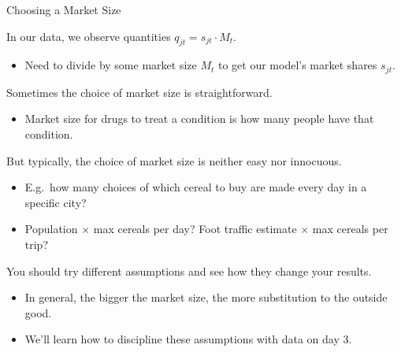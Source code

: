 \documentclass[aspectratio=169,t,11pt,table]{beamer}
\begin{document}
\begin{frame}{Choosing a Market Size}
    \begin{wideitemize}
        \item In our data, we observe quantities $q_{jt} = s_{jt} \cdot M_t$.
        \begin{itemize}
            \item Need to divide by some market size $M_t$ to get our model's market shares $s_{jt}$.
        \end{itemize}
        \pause
        \item Sometimes the choice of market size is straightforward.
        \begin{itemize}
            \item Market size for drugs to treat a condition is how many people have that condition.
        \end{itemize}
        \pause
        \item But typically, the choice of market size is \alert{neither easy nor innocuous}.
        \begin{itemize}
            \item E.g.\ how many choices of which cereal to buy are made every day in a specific city?
            \item Population $\times$ max cereals per day? Foot traffic estimate $\times$ max cereals per trip?
        \end{itemize}
        \pause
        \item You should try different assumptions and see how they change your results.
        \begin{itemize}
            \item In general, the bigger the market size, the more substitution to the outside good.
            \item We'll learn how to discipline these assumptions with data on day 3.
        \end{itemize}
    \end{wideitemize}
\end{frame}
\end{document}
